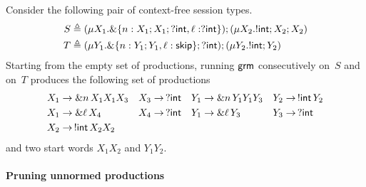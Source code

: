 \begin{example}
  \label{ex:productions}
  Consider the following pair of context-free session types.
  \begin{align*}
    S & \triangleq (\mu X_1. \&\{n: X_1;X_1;?\mathsf{int}, \ell: ?\mathsf{int}\});(\mu X_2. !\mathsf{int} ; X_2;X_2)\\
    T & \triangleq (\mu Y_1. \&\{n: Y_1;Y_1, \ell: \mathsf{skip}\};?\mathsf{int});(\mu Y_2. !\mathsf{int} ; Y_2)
  \end{align*}
  Starting from the empty set of productions, running $\mathsf{grm}$
  consecutively on~$S$ and on~$T$ produces the following set of
  productions
  \begin{align*}
    X_1 &\rightarrow \& n\, X_1 X_1 X_3 & X_3 &\rightarrow \,? \mathsf{int} &
    Y_1 &\rightarrow \& n\, Y_1 Y_1 Y_3 & Y_2 &\rightarrow \,!\mathsf{int}\, Y_2 
    \\
    X_1 &\rightarrow \& \ell\, X_4           & X_4 &\rightarrow \,? \mathsf{int} &
    Y_1 &\rightarrow \& \ell \,Y_3           & Y_3 &\rightarrow \,? \mathsf{int}
    \\
    X_2 &\rightarrow \,!\mathsf{int}\, X_2 X_2
  \end{align*}
  and two start words $X_1X_2$ and $Y_1Y_2$.
\end{example}

\paragraph{Pruning unnormed productions}

